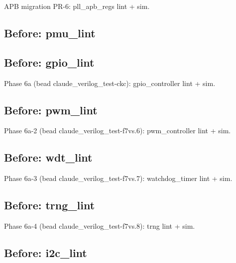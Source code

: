 \begin{record}
\begin{textblock}
APB migration PR-6: pll_apb_regs lint + sim.
\end{textblock}

\subsection*{Before: pmu\_lint}


\subsection*{Before: gpio\_lint}

\begin{textblock}
Phase 6a (bead claude_verilog_test-ckc): gpio_controller lint + sim.
\end{textblock}

\subsection*{Before: pwm\_lint}

\begin{textblock}
Phase 6a-2 (bead claude_verilog_test-f7vs.6): pwm_controller lint + sim.
\end{textblock}

\subsection*{Before: wdt\_lint}

\begin{textblock}
Phase 6a-3 (bead claude_verilog_test-f7vs.7): watchdog_timer lint + sim.
\end{textblock}

\subsection*{Before: trng\_lint}

\begin{textblock}
Phase 6a-4 (bead claude_verilog_test-f7vs.8): trng lint + sim.
\end{textblock}

\subsection*{Before: i2c\_lint}


\end{record}
